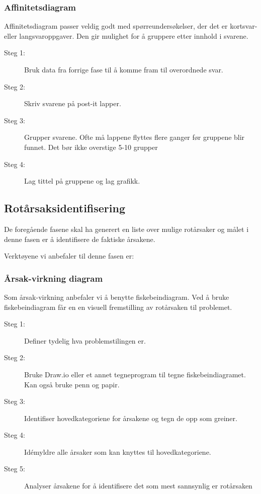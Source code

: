 \subsubsection{Affinitetsdiagram} Affinitetsdiagram passer veldig godt med spørreundersøkelser, der det er kortsvar- eller langsvaroppgaver. Den gir mulighet for å gruppere etter innhold i svarene. 
\begin{description}
    \item[Steg 1:] Bruk data fra forrige fase til å komme fram til overordnede svar.
    \item[Steg 2:] Skriv svarene på post-it lapper.
    \item[Steg 3:] Grupper svarene. Ofte må lappene flyttes flere ganger før gruppene blir funnet. Det bør ikke overstige 5-10 grupper 
    \item[Steg 4:] Lag tittel på gruppene og lag grafikk. 
\end{description}

\subsection{Rotårsaksidentifisering}
De foregående fasene skal ha generert en liste over mulige rotårsaker og målet i denne fasen er å identifisere de faktiske årsakene. 

Verktøyene vi anbefaler til denne fasen er:

\subsubsection{Årsak-virkning diagram} Som årsak-virkning anbefaler vi å benytte fiskebeindiagram. Ved å bruke fiskebeindiagram får en en visuell fremstilling av rotårsaken til problemet.
    \begin{description}
        \item[Steg 1:] Definer tydelig hva problemstilingen er.
        \item[Steg 2:] Bruke Draw.io eller et annet tegneprogram til tegne fiskebeindiagramet. Kan også bruke penn og papir. 
        \item[Steg 3:] Identifiser hovedkategoriene for årsakene og tegn de opp som greiner.
        \item[Steg 4:] Idémyldre alle årsaker som kan knyttes til hovedkategoriene.
        \item[Steg 5:] Analyser årsakene for å identifisere det som mest sannsynlig er rotårsaken
    \end{description}
    
